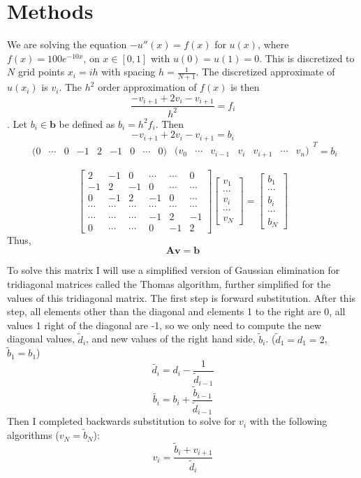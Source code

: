 \documentclass[11pt]{article}
\begin{document}
\section{Methods}
We are solving the equation $-u''(x)=f(x)$ for $u(x)$, where $f(x)=100e^{-10x}$, on $x\in[0,1]$ with $u(0)=u(1)=0$. This is discretized to $N$ grid points $x_i=ih$ with spacing $h=\frac{1}{N+1}$. The discretized approximate of $u(x_i)$ is $v_i$. The $h^2$ order approximation of $f(x)$ is then $$\frac{-v_{i+1}+2v_i-v_{i+1}}{h^2}=f_i$$.
Let $b_i\in\mathbf{b}$ be defined as $b_i=h^2f_i$. Then
$$-v_{i+1}+2v_i-v_{i+1}=b_i$$
$$\begin{matrix}
(0& \cdots&0&-1& 2 & -1 & 0 & \cdots & 0)
\end{matrix}
\begin{matrix}
(v_0&\cdots&v_{i-1}&v_{i}&v_{i+1}&\cdots&v_n)
\end{matrix}^T=b_i$$

$$\begin{bmatrix}
2&-1&0&\cdots&\cdots&0\\
-1&2&-1&0&\cdots&\cdots\\
0&-1&2&-1&0&\cdots\\
\cdots&\cdots&\cdots&\cdots&\cdots&\cdots\\
\cdots&\cdots&\cdots&-1&2&-1\\
0&\cdots&\cdots&0&-1&2
\end{bmatrix}
\begin{bmatrix}
v_1\\\cdots\\v_i\\\cdots\\v_N
\end{bmatrix}
=
\begin{bmatrix}
b_1\\\cdots\\b_i\\\cdots\\b_N
\end{bmatrix}$$
Thus,
$$
\mathbf{Av}=\mathbf{b}
$$

To solve this matrix I will use a simplified version of Gaussian elimination for tridiagonal matrices called the Thomas algorithm, further simplified for the values of this tridiagonal matrix. The first step is forward substitution. After this step, all elements other than the diagonal and elements 1 to the right are 0, all values 1 right of the diagonal are -1, so we only need to compute the new diagonal values, $\tilde{d}_i$, and new values of the right hand side, $\tilde{b}_i$. ($\tilde{d}_1=d_1=2$, $\tilde{b}_1=b_1$)
$$\tilde{d_i} = d_i - \frac{1}{\tilde{d}_{i-1}}$$
$$\tilde{b_i} = b_i + \frac{\tilde{b}_{i-1}}{\tilde{d}_{i-1}}$$
Then I completed backwards substitution to solve for $v_i$ with the following algorithms ($v_N=\tilde{b}_N$):
$$v_i=\frac{\tilde{b}_i+v_{i+1}}{\tilde{d}_i}$$
\end{document}
